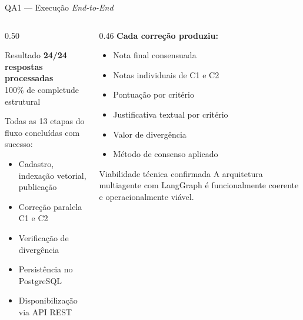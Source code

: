 \documentclass[10pt,aspectratio=169]{beamer}
\begin{document}
\begin{frame}{QA1 — Execução \textit{End-to-End}}
  \begin{columns}[T]
    \begin{column}{0.50\textwidth}
      \begin{alertblock}{Resultado}
        \centering
        \Large \textbf{24/24 respostas processadas}\\
        \large 100\% de completude estrutural
      \end{alertblock}
      \vspace{0.5em}
      Todas as 13 etapas do fluxo concluídas com sucesso:
      \begin{itemize}
        \item Cadastro, indexação vetorial, publicação
        \item Correção paralela C1 e C2
        \item Verificação de divergência
        \item Persistência no PostgreSQL
        \item Disponibilização via API REST
      \end{itemize}
    \end{column}
    \begin{column}{0.46\textwidth}
      \textbf{Cada correção produziu:}
      \begin{itemize}
        \item Nota final consensuada
        \item Notas individuais de C1 e C2
        \item Pontuação por critério
        \item Justificativa textual por critério
        \item Valor de divergência
        \item Método de consenso aplicado
      \end{itemize}
      \vspace{0.4em}
      \begin{block}{Viabilidade técnica confirmada}
        A arquitetura multiagente com LangGraph é funcionalmente coerente e operacionalmente viável.
      \end{block}
    \end{column}
  \end{columns}
\end{frame}
\end{document}
